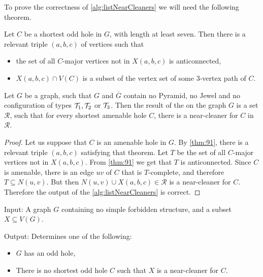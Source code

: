 To prove the correctness of \cref{alg:listNearCleaners} we will need the following theorem.

\begin{theorem}
	\label{thm:91}
	Let $C$ be a shortest odd hole in $G$, with length at least seven. Then there is a relevant triple $(a, b, c)$ of vertices such that
	\begin{itemize}
		\item the set of all $C$-major vertices not in $X(a, b, c)$ is anticonnected,
		\item $X(a, b, c) \cap V(C)$ is a subset of the vertex set of some 3-vertex path of $C$.
	\end{itemize}
\end{theorem}

\begin{theorem}
	Let $G$ be a graph, such that $G$ and $\overline{G}$ contain no Pyramid, no Jewel and no configuration of types $\mathcal{T}_1, \mathcal{T}_2$ or $\mathcal{T}_3$. Then the result of the  on the graph $G$ is a set $\mathcal{R}$, such that for every shortest amenable hole $C$, there is a near-cleaner for $C$ in $\mathcal{R}$.
\end{theorem}
\begin{proof}
	Let us suppose that $C$ is an amenable hole in $G$. By \cref{thm:91}, there is a relevant triple $(a, b, c)$ satisfying that theorem. Let $T$ be the set of all $C$-major vertices not in $X(a,b,c)$. From \cref{thm:91} we get that $T$ is anticonnected. Since $C$ is amenable, there is an edge $uv$ of $C$ that is $T$-complete, and therefore $T \subseteq N(u, v)$. But then $N(u, v) \cup X(a, b, c) \in \mathcal{R}$ is a near-cleaner for $C$. Therefore the output of the \cref{alg:listNearCleaners} is correct.
\end{proof}

\begin{alg}
	\label{alg:testNearCleaner}
	Input: A graph $G$ containing no simple forbidden structure, and a subset $X \subseteq V(G)$.

	\noindent Output: Determines one of the following:
	\begin{itemize}
		\item $G$ has an odd hole,
		\item There is no shortest odd hole $C$ such that $X$ is a near-cleaner for $C$.
	\end{itemize}
\end{alg}

